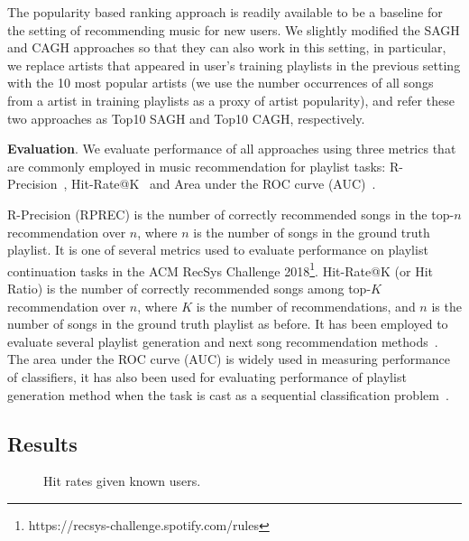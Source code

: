 The popularity based ranking approach is readily available to be a baseline for the setting of recommending music for new users.
%
We slightly modified the SAGH and CAGH approaches so that they can also work in this setting,
in particular, we replace artists that appeared in user's training playlists in the previous setting with the 10 most popular artists
(we use the number occurrences of all songs from a artist in training playlists as a proxy of artist popularity),
and refer these two approaches as Top10 SAGH and Top10 CAGH, respectively.


{\bf Evaluation}.
We evaluate performance of all approaches using three metrics that are commonly employed in music recommendation for playlist tasks:
R-Precision~\cite{manning2008introIR}, Hit-Rate@K~\cite{hariri2012context} and Area under the ROC curve (AUC)~\cite{manning2008introIR}.

R-Precision (RPREC) is the number of correctly recommended songs in the top-$n$ recommendation over $n$,
where $n$ is the number of songs in the ground truth playlist.
It is one of several metrics used to evaluate performance on playlist continuation tasks 
in the ACM RecSys Challenge 2018\footnote{https://recsys-challenge.spotify.com/rules}.
%
Hit-Rate@K (or Hit Ratio) is the number of correctly recommended songs among top-$K$ recommendation over $n$,
where $K$ is the number of recommendations, and $n$ is the number of songs in the ground truth playlist as before.
It has been employed to evaluate several playlist generation and next song recommendation 
methods~\cite{hariri2012context,bonnin2013evaluating,bonnin2015automated,jannach2015beyond}.
%
The area under the ROC curve (AUC) is widely used in measuring performance of classifiers,
it has also been used for evaluating performance of playlist generation method when the task
is cast as a sequential classification problem~\cite{ben2017groove}.



\subsection{Results}



\begin{figure}[!h]
\centering
\caption{Hit rates given known users.}
\end{figure}



